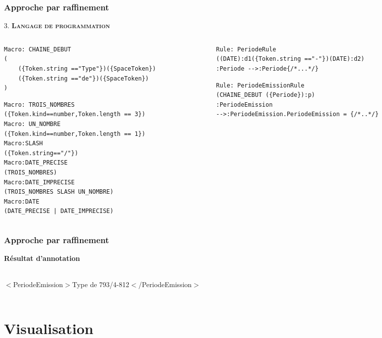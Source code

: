 \documentclass[10pt, compress]{beamer}
\begin{document}
\begin{frame}[fragile,t]
  \frametitle{Approche par raffinement}
\begin{center}
 
\end{center}
3. \textbf{\textsc{\textbf{Langage de programmation}}}\\
\begin{columns}[t]
  \begin{column}{.5\linewidth}
\begin{lstlisting}
Macro: CHAINE_DEBUT
(
    ({Token.string =="Type"})({SpaceToken})
    ({Token.string =="de"})({SpaceToken})
)
\end{lstlisting}
\begin{lstlisting}
Macro: TROIS_NOMBRES
({Token.kind==number,Token.length == 3})
Macro: UN_NOMBRE
({Token.kind==number,Token.length == 1})
Macro:SLASH
({Token.string=="/"})
Macro:DATE_PRECISE
(TROIS_NOMBRES)
Macro:DATE_IMPRECISE
(TROIS_NOMBRES SLASH UN_NOMBRE)
Macro:DATE
(DATE_PRECISE | DATE_IMPRECISE)
\end{lstlisting}
\end{column}


\begin{column}{.5\linewidth}
\begin{lstlisting}
Rule: PeriodeRule
((DATE):d1({Token.string =="-"})(DATE):d2)
:Periode -->:Periode{/*...*/}
\end{lstlisting}
\begin{lstlisting}
Rule: PeriodeEmissionRule
(CHAINE_DEBUT ({Periode}):p)
:PeriodeEmission
-->:PeriodeEmission.PeriodeEmission = {/*..*/}
\end{lstlisting}
\end{column}
\end{columns}
\end{frame}

\begin{frame}[fragile]
  \frametitle{Approche par raffinement}
\textbf{Résultat d'annotation}\\~
\begin{center}
\alert{$<$PeriodeEmission$>$}Type de 793/4-812\alert{$<$/PeriodeEmission$>$}\\~\\
\end{center}
\hfill{}

\end{frame}

\section{Visualisation}
\end{document}
